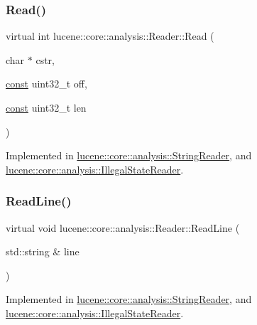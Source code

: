 \subsubsection{\texorpdfstring{Read()}{Read()}\hspace{0.1cm}{\footnotesize\ttfamily [2/2]}}
{\footnotesize\ttfamily virtual int lucene\+::core\+::analysis\+::\+Reader\+::\+Read (\begin{DoxyParamCaption}\item[{char $\ast$}]{cstr,  }\item[{\mbox{\hyperlink{ZlibCrc32_8h_a2c212835823e3c54a8ab6d95c652660e}{const}} uint32\+\_\+t}]{off,  }\item[{\mbox{\hyperlink{ZlibCrc32_8h_a2c212835823e3c54a8ab6d95c652660e}{const}} uint32\+\_\+t}]{len }\end{DoxyParamCaption})\hspace{0.3cm}{\ttfamily [pure virtual]}}



Implemented in \mbox{\hyperlink{classlucene_1_1core_1_1analysis_1_1StringReader_ab048d6d6d759175eeda5321a480995c3}{lucene\+::core\+::analysis\+::\+String\+Reader}}, and \mbox{\hyperlink{classlucene_1_1core_1_1analysis_1_1IllegalStateReader_a8017ca4fc795b71e16bb87d4a24bdfa9}{lucene\+::core\+::analysis\+::\+Illegal\+State\+Reader}}.

\mbox{\label{classlucene_1_1core_1_1analysis_1_1Reader_a475ba046fd74e43a1cce4c4702c791c2}} 
\subsubsection{\texorpdfstring{Read\+Line()}{ReadLine()}}
{\footnotesize\ttfamily virtual void lucene\+::core\+::analysis\+::\+Reader\+::\+Read\+Line (\begin{DoxyParamCaption}\item[{std\+::string \&}]{line }\end{DoxyParamCaption})\hspace{0.3cm}{\ttfamily [pure virtual]}}



Implemented in \mbox{\hyperlink{classlucene_1_1core_1_1analysis_1_1StringReader_a5bf198e593389f1255ec7a4f69f3187d}{lucene\+::core\+::analysis\+::\+String\+Reader}}, and \mbox{\hyperlink{classlucene_1_1core_1_1analysis_1_1IllegalStateReader_a39217e818ee6678830260a10885400f8}{lucene\+::core\+::analysis\+::\+Illegal\+State\+Reader}}.

